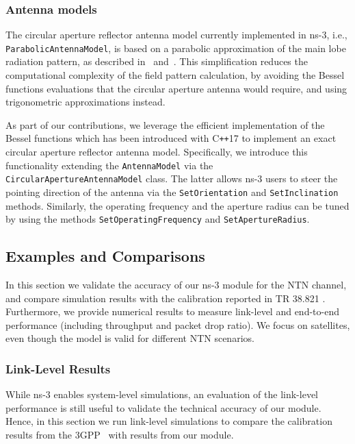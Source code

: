 \subsubsection{Antenna models}
The circular aperture reflector antenna model currently implemented in ns-3, i.e., \texttt{Parabolic\-Antenna\-Model}, is based on a parabolic approximation of the main lobe radiation pattern, as described in~\cite{parabolicantenna3gpp} and~\cite{parabolicantennamodel}. This simplification reduces the computational complexity of the field pattern calculation, by avoiding the Bessel functions evaluations that the circular aperture antenna would require, and using trigonometric approximations instead. 

As part of our contributions, we leverage the efficient implementation of the Bessel functions which has been introduced with C\texttt{++}17 to implement an exact circular aperture reflector antenna model. Specifically, we introduce this functionality extending the \texttt{Antenna\-Model} via the \texttt{Circular\-Aperture\-Antenna\-Model} class.
The latter allows ns-3 users to steer the pointing direction of the antenna via the \texttt{Set\-Orientation} and \texttt{Set\-Inclination} methods.
Similarly, the operating frequency and the aperture radius %
can be tuned by using the methods \texttt{Set\-Operating\-Frequency} and \texttt{Set\-Aperture\-Radius}.

\subsection{Examples and Comparisons}
\label{sec:results-ntn}
In this section we validate the accuracy of our ns-3 module for the NTN channel, and compare simulation results with the calibration reported in TR 38.821 \cite{38821}. Furthermore, we provide numerical results to measure link-level and end-to-end performance (including throughput and packet drop ratio). We focus on satellites, even though the model is valid for different NTN scenarios.

\subsubsection{Link-Level Results}
\label{sub:ll}
While ns-3 enables system-level simulations, an evaluation of the link-level performance is still useful to validate the technical accuracy of our module. Hence, in this section we run link-level simulations to compare the calibration results from the 3GPP~\cite{38821} with results from our module. 

